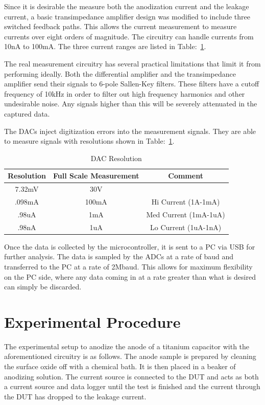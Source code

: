 \documentclass[journal]{IEEEtran}
\begin{document}
Since it is desirable the measure both the anodization current and the leakage current, a basic transimpedance amplifier design was modified to include three switched feedback paths. This allows the current measurement to measure currents over eight orders of magnitude. The circuitry can handle currents from 10nA to 100mA. The three current ranges are listed in Table:~\ref{tab:dacRes}.

The real measurement circuitry has several practical limitations that limit it from performing ideally. Both the differential amplifier and the transimpedance amplifier send their signals to 6-pole Sallen-Key filters. These filters have a cutoff frequency of 10kHz \cite{sThesis} in order to filter out high frequency harmonics and other undesirable noise. Any signals higher than this will be severely attenuated in the captured data.

The DACs inject digitization errors into the measurement signals. They are able to measure signals with resolutions shown in Table:~\ref{tab:dacRes}.


\begin{table}[here]
\renewcommand{\arraystretch}{1.3}
\caption{DAC Resolution}
\label{tab:dacRes}
\centering
\begin{tabular}{c||c||c}
\hline
\bfseries Resolution & \bfseries Full Scale Measurement & \bfseries Comment\\
\hline\hline
7.32mV & 30V & \\
\hline\hline
.098mA & 100mA & Hi Current (1A-1mA)\\
\hline\hline
.98uA & 1mA & Med Current (1mA-1uA) \\
\hline\hline
.98nA & 1uA & Lo Current (1uA-1nA)\\
\hline
\end{tabular}
\end{table}

Once the data is collected by the microcontroller, it is sent to a PC via USB for further analysis. The data is sampled by the ADCs at a rate of baud and transferred to the PC at a rate of 2Mbaud. This allows for maximum flexibility on the PC side, where any data coming in at a rate greater than what is desired can simply be discarded.

\section{Experimental Procedure}
The experimental setup to anodize the anode of a titanium capacitor with the aforementioned circuitry is as follows. The anode sample is prepared by cleaning the surface oxide off with a chemical bath. It is then placed in a beaker of anodizing solution. The current source is connected to the DUT and acts as both a current source and data logger until the test is finished and the current through the DUT has dropped to the leakage current.
\end{document}
